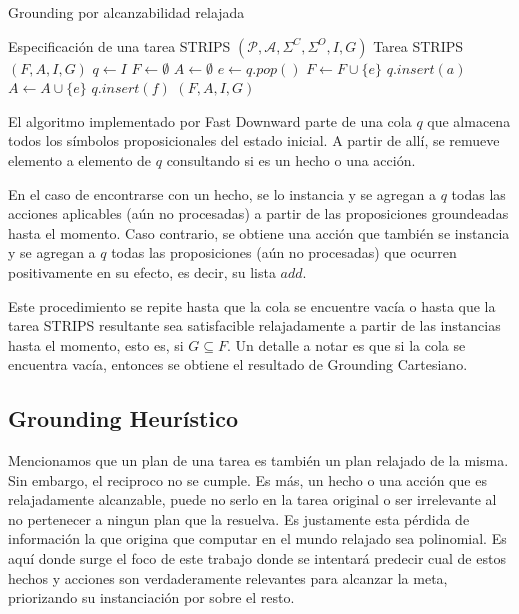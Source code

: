 \begin{algorithm}
    \caption{Grounding por alcanzabilidad relajada}\label{alg:cap}
    \begin{algorithmic}
    \Require Especificación de una tarea STRIPS $(\mathcal{P}, \mathcal{A},
    \Sigma^{C}, \Sigma^{O}, I, G)$
    \Ensure Tarea STRIPS $(F, A, I, G)$ 
    \State $q \gets I$
    \State $F \gets \emptyset$
    \State $A \gets \emptyset$
    \State $e \gets q.pop()$
        \State $F \gets F \cup \{e\}$
            \State $q.insert(a)$
        \EndFor
    \Else
        \State $A \gets A \cup \{e\}$
            \State $q.insert(f)$
        \EndFor
    \EndIf
    \EndWhile
    \State \Return $(F, A, I, G)$
    \end{algorithmic}
\end{algorithm}

El algoritmo implementado por Fast Downward parte de una cola $q$ que almacena
todos los símbolos proposicionales del estado inicial. A partir de allí, se
remueve elemento a elemento de $q$ consultando si es un hecho o una acción.

En el caso de encontrarse con un hecho, se lo instancia y se agregan a $q$ todas
las acciones aplicables (aún no procesadas) a partir de las proposiciones
groundeadas hasta el momento. Caso contrario, se obtiene una acción que también
se instancia y se agregan a $q$ todas las proposiciones (aún no procesadas) que
ocurren positivamente en su efecto, es decir, su lista $add$.

Este procedimiento se repite hasta que la cola se encuentre vacía o hasta que la
tarea STRIPS resultante sea satisfacible relajadamente a partir de las
instancias hasta el momento, esto es, si $G \subseteq F$. Un detalle a notar
es que si la cola se encuentra vacía, entonces se obtiene el resultado de
Grounding Cartesiano.

\subsection{Grounding Heurístico}

Mencionamos que un plan de una tarea es también un plan relajado de la misma.
Sin embargo, el reciproco no se cumple. Es más, un hecho o una acción que es
relajadamente alcanzable, puede no serlo en la tarea original o ser irrelevante
al no pertenecer a ningun plan que la resuelva. Es justamente esta pérdida de
información la que origina que computar en el mundo relajado sea polinomial. Es
aquí donde surge el foco de este trabajo donde se intentará predecir cual de estos
hechos y acciones son verdaderamente relevantes para alcanzar la meta, priorizando
su instanciación por sobre el resto.

